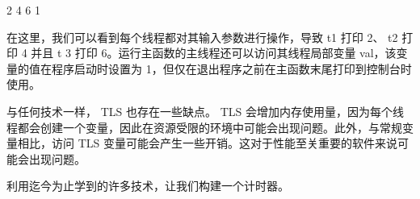 \begin{shell}
2 4 6 1
\end{shell}

在这里，我们可以看到每个线程都对其输入参数进行操作，导致 t1 打印 2、 t2 打印 4 并且 t 3 打印 6。运行主函数的主线程还可以访问其线程局部变量 val，该变量的值在程序启动时设置为 1，但仅在退出程序之前在主函数末尾打印到控制台时使用。

与任何技术一样， TLS 也存在一些缺点。 TLS 会增加内存使用量，因为每个线程都会创建一个变量，因此在资源受限的环境中可能会出现问题。此外，与常规变量相比，访问 TLS 变量可能会产生一些开销。这对于性能至关重要的软件来说可能会出现问题。

利用迄今为止学到的许多技术，让我们构建一个计时器。



